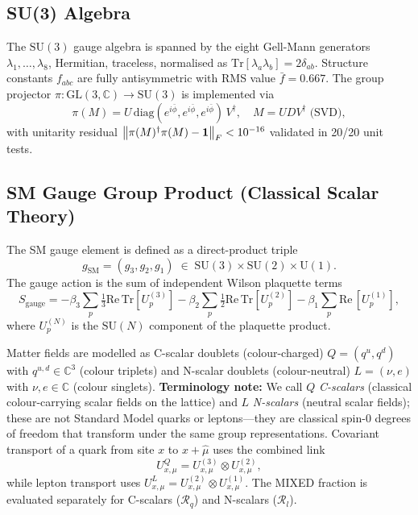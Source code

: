 \documentclass[12pt,a4paper]{article}
\newcommand{\R}{\mathcal{R}}           %
\newcommand{\SU}[1]{\mathrm{SU}(#1)}
\newcommand{\UN}[1]{\mathrm{U}(#1)}
\theoremstyle{plain}
\theoremstyle{definition}
\theoremstyle{remark}
\begin{document}
\subsection{SU(3) Algebra}

The $\SU{3}$ gauge algebra is spanned by the eight Gell-Mann generators
$\lambda_1,\ldots,\lambda_8$, Hermitian, traceless, normalised as
$\mathrm{Tr}[\lambda_a\lambda_b]=2\delta_{ab}$.
Structure constants $f_{abc}$ are fully antisymmetric with RMS value
$\bar{f}=0.667$.
The group projector $\pi:\mathrm{GL}(3,\mathbb{C})\to\SU{3}$ is implemented via
\begin{equation}
  \pi(M) = U\,\mathrm{diag}(e^{i\bar{\phi}},e^{i\bar{\phi}},e^{i\bar{\phi}})\,V^\dagger,
  \quad M=UDV^\dagger \;\text{(SVD)},
\end{equation}
with unitarity residual $\norm{\pi(M)^\dagger\pi(M)-\mathbf{1}}_F < 10^{-16}$
validated in 20/20 unit tests.

\subsection{SM Gauge Group Product (Classical Scalar Theory)}

The SM gauge element is defined as a direct-product triple
\begin{equation}
  g_\text{SM} = (g_3, g_2, g_1) \;\in\; \SU{3}\times\SU{2}\times\UN{1}.
\end{equation}
The gauge action is the sum of independent Wilson plaquette terms
\begin{equation}
  S_\text{gauge} = -\beta_3 \sum_p \tfrac{1}{3}\mathrm{Re}\,\mathrm{Tr}[U_p^{(3)}]
                   -\beta_2 \sum_p \tfrac{1}{2}\mathrm{Re}\,\mathrm{Tr}[U_p^{(2)}]
                   -\beta_1 \sum_p \mathrm{Re}\,[U_p^{(1)}],
\end{equation}
where $U_p^{(N)}$ is the $\SU{N}$ component of the plaquette product.

Matter fields are modelled as C-scalar doublets (colour-charged) $Q=(q^u, q^d)$ with $q^{u,d}\in\mathbb{C}^3$
(colour triplets) and N-scalar doublets (colour-neutral) $L=(\nu,e)$ with $\nu,e\in\mathbb{C}$ (colour
singlets).
\textbf{Terminology note:} We call $Q$ \emph{C-scalars} (classical colour-carrying scalar fields
on the lattice) and $L$ \emph{N-scalars} (neutral scalar fields); these are
not Standard Model quarks or leptons---they are classical spin-0 degrees of freedom
that transform under the same group representations.
Covariant transport of a quark from site $x$ to $x+\hat\mu$ uses the combined link
\begin{equation}
  U^Q_{x,\mu} = U^{(3)}_{x,\mu}\otimes U^{(2)}_{x,\mu},
\end{equation}
while lepton transport uses $U^L_{x,\mu} = U^{(2)}_{x,\mu}\otimes U^{(1)}_{x,\mu}$.
The MIXED fraction is evaluated separately for C-scalars ($\R_q$) and N-scalars ($\R_l$).
\end{document}
